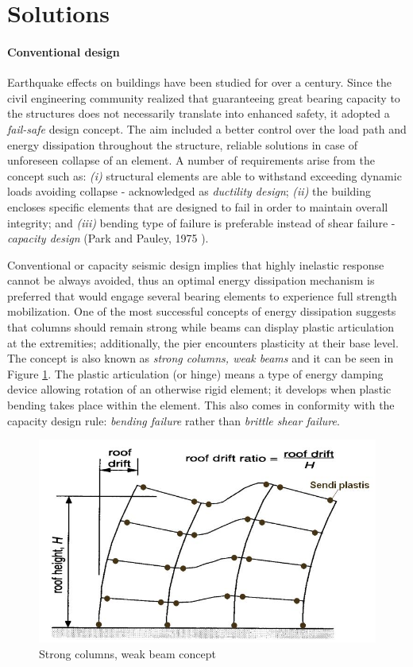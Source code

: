 \documentclass[12pt,a4paper]{report}
\begin{document}
\section{Solutions}
\paragraph{Conventional design}
Earthquake effects on buildings have been studied for over a century. Since the civil engineering community realized that guaranteeing great bearing capacity to the structures does not necessarily translate into enhanced safety, it adopted a \textit{fail-safe} design concept. The aim included a better control over the load path and energy dissipation throughout the structure, reliable solutions in case of unforeseen collapse of an element. A number of requirements arise from the concept such as: \textit{(i)} structural elements are able to withstand exceeding dynamic loads avoiding collapse - acknowledged as \textit{ductility design}; \textit{(ii)} the building encloses specific elements that are designed to fail in order to maintain overall integrity; and \textit{(iii)} bending type of failure is preferable instead of shear failure - \textit{capacity design} (Park and Pauley, 1975 \cite{park1984seismic}).

Conventional or capacity seismic design implies that highly inelastic response cannot be always avoided, thus an optimal energy dissipation mechanism is preferred that would engage several bearing elements to experience full strength mobilization. One of the most successful concepts of energy dissipation suggests that columns should remain strong while beams can display plastic articulation at the extremities; additionally, the pier encounters plasticity at their base level. The concept is also known as \textit{strong columns, weak beams} and it can be seen in Figure \ref{strongCol}. The plastic articulation (or hinge) means a type of energy damping device allowing rotation of an otherwise rigid element; it develops when plastic bending takes place within the element. This also comes in conformity with the capacity design rule:  \textit{bending failure} rather than \textit{brittle shear failure}.

\begin{figure}[h!]
	\centering
	\includegraphics[width=0.5\linewidth]{"plastification"}
	\caption{Strong columns, weak beam concept}
	\label{strongCol}
\end{figure}
\end{document}
